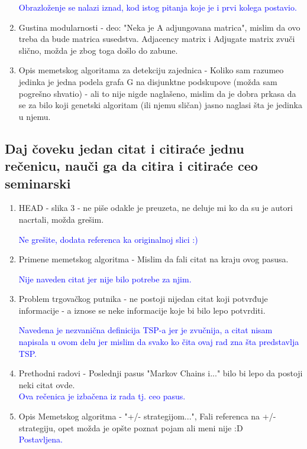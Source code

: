 \documentclass[a4paper]{report}
\newcommand{\odgovor}[1]{\textcolor{blue}{#1}}
\begin{document}
\begin{enumerate}
    \odgovor{ Obrazloženje se nalazi iznad, kod istog pitanja koje je i prvi kolega postavio. } 
    
 \item Gustina modularnosti - deo: "Neka je A adjungovana matrica", mislim da ovo treba da bude matrica susedstva. Adjacency matrix i Adjugate matrix zvuči slično, možda je zbog toga došlo do zabune.
  \item Opis memetskog algoritama za detekciju zajednica - Koliko sam razumeo jedinka je jedna podela grafa G na disjunktne podskupove (možda sam pogrešno shvatio) - ali to nije nigde naglašeno, mislim da je dobra prkasa da se za bilo koji genetski algoritam (ili njemu sličan) jasno naglasi šta je jedinka u njemu.
\end{enumerate}

\subsection{Daj čoveku jedan citat i citiraće jednu rečenicu, nauči ga da citira i citiraće ceo seminarski}
\begin{enumerate}
  \item HEAD - slika 3 - ne piše odakle je preuzeta, ne deluje mi ko da su je autori nacrtali, možda grešim.
  
  \odgovor{Ne grešite, dodata referenca ka originalnoj slici :)}
  \item Primene memetskog algoritma - Mislim da fali citat na kraju ovog pasusa.
  
  \odgovor{Nije naveden citat jer nije bilo potrebe za njim.}
  
  \item Problem trgovačkog putnika - ne postoji nijedan citat koji potvrđuje informacije - a iznose se neke informacije koje bi bilo lepo potvrditi.
  
  \odgovor{ Navedena je nezvanična definicija TSP-a jer je zvučnija, a citat nisam napisala u ovom delu jer mislim da svako ko čita ovaj rad zna šta predstavlja TSP.}
  \item Prethodni radovi - Poslednji pasus "Markov Chains i..."  bilo bi lepo da postoji neki citat ovde. \\
    \odgovor{Ova rečenica je izbačena iz rada tj. ceo pasus.}
  
  \item Opis Memetskog algoritma - "+/- strategijom...", Fali referenca na +/- strategiju, opet možda je opšte poznat pojam ali meni nije :D \\
  \odgovor{Postavljena. \\}
  
\end{enumerate}
\end{document}
